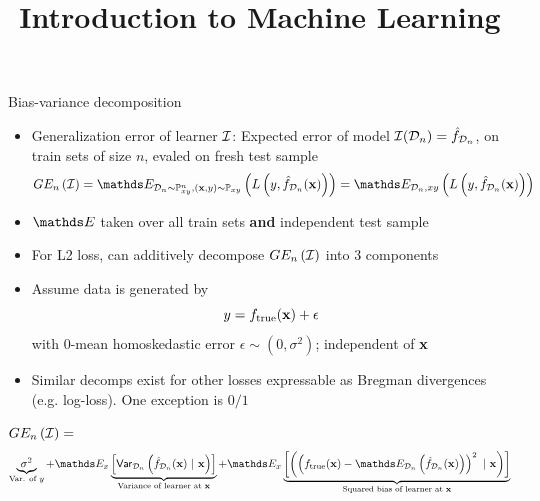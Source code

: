 \documentclass[11pt,compress,t,notes=noshow, xcolor=table]{beamer}
\title{Introduction to Machine Learning}
\begin{document}
    

\begin{vbframe} {Bias-variance decomposition}

\begin{itemize} 
\item Generalization error of learner  $\mathcal{I}$: 
Expected error of model $\mathcal{I}(\mathcal{D}_n) = \hat{f}_{\mathcal{D}_n}$, on train sets of size $n$, evaled on fresh test sample
$$
GE_n\left(\ind\right) = \E_{\D_n \sim \Pxy^n, (\xv, y) \sim \Pxy}\left( L\left(y, \fh_{\D_n}(\xv)\right) \right) = \E_{\D_n, xy}\left( L\left(y, \fh_{\D_n}(\xv)\right) \right)  
$$

\item $\E$ taken over all train sets \textbf{and} independent test sample

\item For L2 loss, can additively decompose  $GE_n\left(\mathcal{I}\right)$ into 3 components

\item Assume data is generated by 
$$
y = f_{\text{true}}(\mathbf{x}) + \epsilon
$$
with 0-mean homoskedastic error $\epsilon \sim (0, \sigma^2)$; independent of $\mathbf{x}$

\item Similar decomps exist for other losses expressable as Bregman divergences (e.g. log-loss). One exception is $0/1$ 

\end{itemize} 

\framebreak 


$GE_n\left(\mathcal{I}\right) =$  
$$
 \underbrace{\sigma^2}_{\text{Var. of $y$}} + \E_{x}\underbrace{\left[\var_{\D_n}\left(\fh_{\D_n}(\xv) ~|~\xv\right)\right]}_{\text{Variance of learner at } \xv} + \E_{x}\underbrace{\left[\left(\left(\ftrue(\xv)-\E_{\D_n}\left(\fh_{\D_n}(\xv)\right)\right)^2~|~\xv\right)\right]}_{\text{Squared bias of learner at } \xv}  
$$


\end{vbframe}
\end{document}
